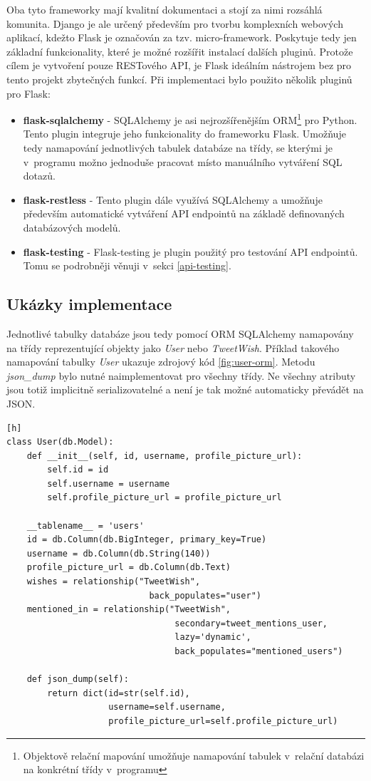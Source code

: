 \documentclass[thesis=B,czech]{FITthesis}[2012/06/26]
\begin{document}
	Oba tyto frameworky mají kvalitní dokumentaci a stojí za nimi rozsáhlá komunita. Django je ale určený především pro tvorbu komplexních webových aplikací, kdežto Flask je označován za tzv. micro-framework. Poskytuje tedy jen základní funkcionality, které je možné rozšířit instalací dalších pluginů. Protože cílem je vytvoření pouze RESTového API, je Flask ideálním nástrojem bez pro tento projekt zbytečných funkcí. Při implementaci bylo použito několik pluginů pro Flask:
	
\begin{itemize}
\item \textbf{flask-sqlalchemy} - SQLAlchemy je asi nejrozšířenějším ORM\footnote{Objektově relační mapování umožňuje namapování tabulek v~relační databázi na konkrétní třídy v~programu} pro Python. Tento plugin integruje jeho funkcionality do frameworku Flask. Umožňuje tedy namapování jednotlivých tabulek databáze na třídy, se kterými je v~programu možno jednoduše pracovat místo manuálního vytváření SQL dotazů. 
\item \textbf{flask-restless} - Tento plugin dále využívá SQLAlchemy a umožňuje především automatické vytváření API endpointů na základě definovaných databázových modelů. 
\item \textbf{flask-testing} - Flask-testing je plugin použitý pro testování API endpointů. Tomu se podrobněji věnuji v~sekci \ref{api-testing}.
\end{itemize}

\subsection{Ukázky implementace}
Jednotlivé tabulky databáze jsou tedy pomocí ORM SQLAlchemy namapovány na třídy reprezentující objekty jako \textit{User} nebo \textit{TweetWish}. Příklad takového namapování tabulky \textit{User} ukazuje zdrojový kód \ref{fig:user-orm}. Metodu \textit{json\_dump} bylo nutné naimplementovat pro všechny třídy. Ne všechny atributy jsou totiž implicitně serializovatelné a není je tak možné automaticky převádět na JSON. 

\begin{lstlisting}[caption={Ukázka použití ORM SQLAlchemy},label=fig:user-orm][h]
class User(db.Model):
	def __init__(self, id, username, profile_picture_url):
		self.id = id
		self.username = username
		self.profile_picture_url = profile_picture_url

	__tablename__ = 'users'
	id = db.Column(db.BigInteger, primary_key=True)
	username = db.Column(db.String(140))
	profile_picture_url = db.Column(db.Text)
	wishes = relationship("TweetWish",
							back_populates="user")
	mentioned_in = relationship("TweetWish",
    							 secondary=tweet_mentions_user,
								 lazy='dynamic',
								 back_populates="mentioned_users")

	def json_dump(self):
		return dict(id=str(self.id),
					username=self.username,
					profile_picture_url=self.profile_picture_url)
\end{lstlisting}
\end{document}
